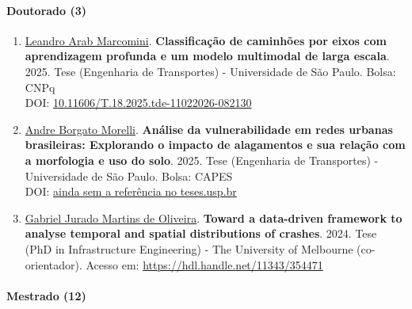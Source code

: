 \documentclass[
  brazilian,
  11pt,
  a4paper,
]{article}
\begin{document}
\paragraph{Doutorado (3)}\label{doutorado-3}

\begin{enumerate}
\def\labelenumi{\arabic{enumi}.}
\item
  \href{https://scholar.google.com/citations?user=AcNWryQAAAAJ}{Leandro
  Arab Marcomini}. \textbf{Classificação de caminhões por eixos com
  aprendizagem profunda e um modelo multimodal de larga escala}. 2025.
  Tese (Engenharia de Transportes) - Universidade de São Paulo. Bolsa:
  CNPq\\
  DOI:
  \href{https://doi.org/10.11606/T.18.2025.tde-11022026-082130}{10.11606/T.18.2025.tde-11022026-082130}
\item
  \href{https://scholar.google.com/citations?user=BqdPZ2gAAAAJ}{Andre
  Borgato Morelli}. \textbf{Análise da vulnerabilidade em redes urbanas
  brasileiras: Explorando o impacto de alagamentos e sua relação com a
  morfologia e uso do solo}. 2025. Tese (Engenharia de Transportes) -
  Universidade de São Paulo. Bolsa: CAPES\\
  DOI: \href{}{ainda sem a referência no teses.usp.br}
\item
  \href{https://lattes.cnpq.br/1828432370828925}{Gabriel Jurado Martins
  de Oliveira}. \textbf{Toward a data-driven framework to analyse
  temporal and spatial distributions of crashes}. 2024. Tese (PhD in
  Infrastructure Engineering) - The University of Melbourne
  (co-orientador). Acesso em: \url{https://hdl.handle.net/11343/354471}
\end{enumerate}

\paragraph{Mestrado (12)}\label{mestrado-12}
\end{document}
